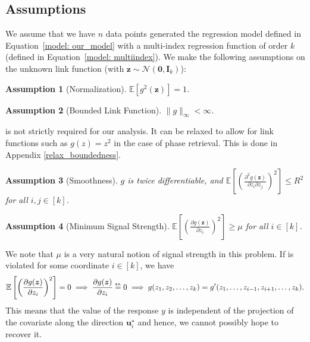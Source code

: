 \documentclass[final,12pt]{colt2018} %
\newcommand{\E}{\mathbb{E}}
\newcommand{\explain}[2]{\mathrel{\overset{\makebox[0pt]{\mbox{\normalfont\tiny\sffamily #1}}}{#2}}}
\newcommand{\gauss}[2]{\mathcal{N}\left( #1,#2 \right)}
\renewcommand\v[1]{{\ensuremath{\boldsymbol{#1}}}}
\newtheorem{assumption}{Assumption}
\begin{document}
\subsection{Assumptions}
We assume that we have $n$ data points generated the regression model defined in Equation~\eqref{model: our_model} with a multi-index regression function of order $k$ (defined in Equation~\eqref{model: multiindex}). 
We make the following assumptions on the unknown link function (with $\v z \sim \gauss{\v 0}{\v I_k}$):
\begin{assumption}[Normalization] $\E[g^2(\v z)] = 1$.
\label{assumption: normalization}
\end{assumption}

\begin{assumption}[Bounded Link Function]
    $\| g\|_\infty < \infty$.
\label{assumption: bounded_link}
\end{assumption}

\begin{remark}  is not strictly required for our analysis. It can be relaxed to allow for link functions such as $g(z) = z^2$ in the case of phase retrieval. This is done in Appendix \ref{relax_boundedness}.
\end{remark}
\begin{assumption}[Smoothness] $g$ is twice differentiable, and $\E [ (\frac{\partial^2 g(\v z)}{\partial z_i \partial z_j})^2 ] \leq R^2$ for all $i,j \in [k]$.
\label{assumption: smoothness}
\end{assumption}

\begin{assumption}[Minimum Signal Strength] 
$\E[( \frac{\partial g(\v z)}{\partial z_i})^2] \geq \mu$ for all $i \in [k]$.
\label{assumption: min_sig_strength}
\end{assumption}

\begin{remark}We note that $\mu$ is a very natural notion of signal strength in this problem. If  is violated for some coordinate $i \in [k]$, we have
\begin{align*}
    \E \left[ \left( \frac{\partial g(\v z)}{\partial z_i} \right)^2 \right] = 0 \implies \frac{\partial g(\v z)}{\partial z_i} \explain{a.s.}{=} 0 \implies g(z_1, z_2, \dotsc, z_k) = g^\prime(z_1, \dotsc, z_{i-1}, z_{i+1}, \dotsc, z_k).
\end{align*}
This means that the value of the response $y$ is independent of the projection of the covariate along the direction $\v u_i^\star$ and hence, we cannot possibly hope to recover it. 
\end{remark}
\end{document}
